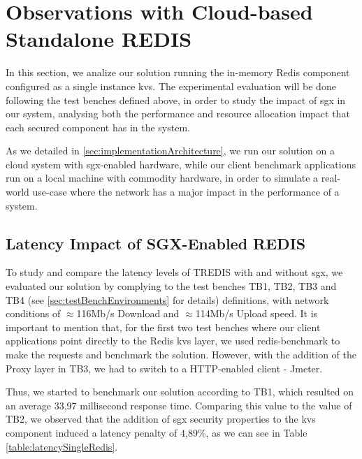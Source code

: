 \section{Observations with Cloud-based Standalone REDIS}
\label{sec:cloudS_Redis}

In this section, we analize our solution running the in-memory Redis component configured as a single instance \gls{kvs}. The experimental evaluation will be done following the test benches defined above, in order to study the impact of \gls{sgx} in our system, analysing both the performance and resource allocation impact that each secured component has in the system.

As we detailed in \ref{sec:implementationArchitecture}, we run our solution on a cloud system with \gls{sgx}-enabled hardware, while our client benchmark applications run on a local machine with commodity hardware, in order to simulate a real-world use-case where the network has a major impact in the performance of a system.

\subsection{Latency Impact of SGX-Enabled REDIS}

To study and compare the latency levels of TREDIS with and without \gls{sgx}, we evaluated our solution by complying to the test benches TB1, TB2, TB3 and TB4 (see \ref{sec:testBenchEnvironments} for details) definitions, with network conditions of $\approx$116Mb/s Download and $\approx$114Mb/s Upload speed. It is important to mention that, for the first two test benches where our client applications point directly to the Redis \gls{kvs} layer, we used redis-benchmark to make the requests and benchmark the solution. However, with the addition of the Proxy layer in TB3, we had to switch to a HTTP-enabled client - Jmeter.

Thus, we started to benchmark our solution according to TB1, which resulted on an average 33,97 millisecond response time.
Comparing this value to the value of TB2, we observed that the addition of \gls{sgx} security properties to the \gls{kvs} component induced a latency penalty of 4,89\%, as we can see in Table \ref{table:latencySingleRedis}.


